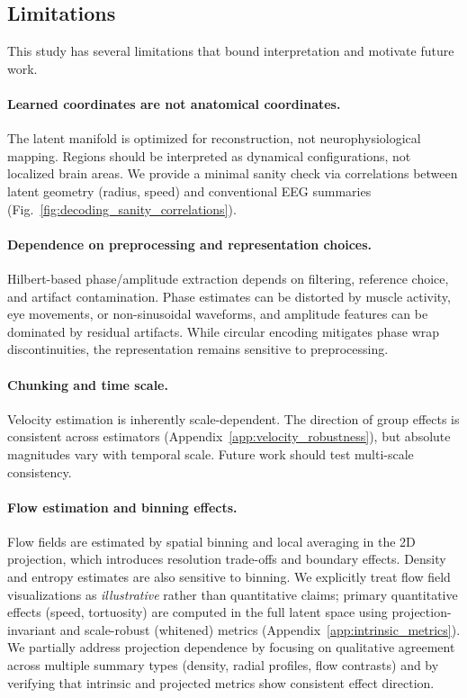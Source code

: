 \documentclass[5p,twocolumn,authoryear]{elsarticle}
\newcommand{\figref}[1]{Fig.~\ref{#1}}
\begin{document}
\subsection{Limitations}
\label{sec:limitations}
This study has several limitations that bound interpretation and motivate future work.

\paragraph{Learned coordinates are not anatomical coordinates.}
The latent manifold is optimized for reconstruction, not neurophysiological mapping. Regions should be interpreted as dynamical configurations, not localized brain areas. We provide a minimal sanity check via correlations between latent geometry (radius, speed) and conventional EEG summaries (\figref{fig:decoding_sanity_correlations}).

\paragraph{Dependence on preprocessing and representation choices.}
Hilbert-based phase/amplitude extraction depends on filtering, reference choice, and artifact contamination. Phase estimates can be distorted by muscle activity, eye movements, or non-sinusoidal waveforms, and amplitude features can be dominated by residual artifacts. While circular encoding mitigates phase wrap discontinuities, the representation remains sensitive to preprocessing. 

\paragraph{Chunking and time scale.}
Velocity estimation is inherently scale-dependent. The direction of group effects is consistent across estimators (Appendix~\ref{app:velocity_robustness}), but absolute magnitudes vary with temporal scale. Future work should test multi-scale consistency.

\paragraph{Flow estimation and binning effects.}
Flow fields are estimated by spatial binning and local averaging in the 2D projection, which introduces resolution trade-offs and boundary effects. Density and entropy estimates are also sensitive to binning. We explicitly treat flow field visualizations as \emph{illustrative} rather than quantitative claims; primary quantitative effects (speed, tortuosity) are computed in the full latent space using projection-invariant and scale-robust (whitened) metrics (Appendix~\ref{app:intrinsic_metrics}). We partially address projection dependence by focusing on qualitative agreement across multiple summary types (density, radial profiles, flow contrasts) and by verifying that intrinsic and projected metrics show consistent effect direction.
\end{document}
